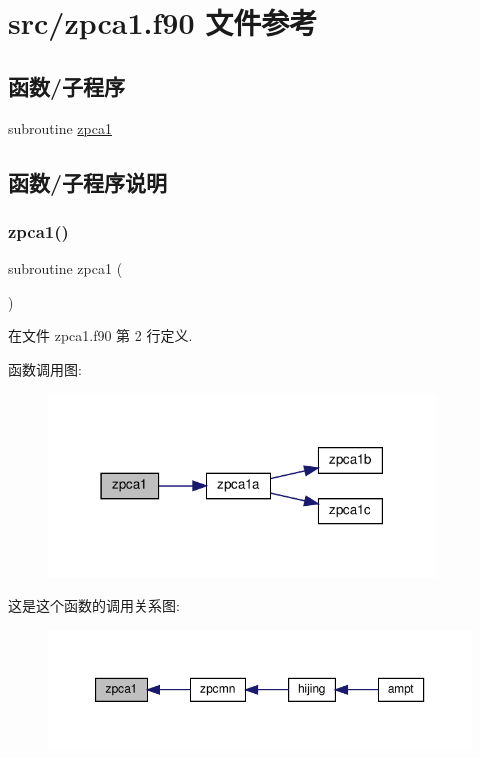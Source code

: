 \hypertarget{zpca1_8f90}{}\section{src/zpca1.f90 文件参考}
\label{zpca1_8f90}
\subsection*{函数/子程序}
\begin{DoxyCompactItemize}
\item 
subroutine \mbox{\hyperlink{zpca1_8f90_a08b079fdaae5d2ad9c8113386a744b39}{zpca1}}
\end{DoxyCompactItemize}


\subsection{函数/子程序说明}
\mbox{\label{zpca1_8f90_a08b079fdaae5d2ad9c8113386a744b39}} 
\subsubsection{\texorpdfstring{zpca1()}{zpca1()}}
{\footnotesize\ttfamily subroutine zpca1 (\begin{DoxyParamCaption}{ }\end{DoxyParamCaption})}



在文件 zpca1.\+f90 第 2 行定义.

函数调用图\+:
\nopagebreak
\begin{figure}[H]
\begin{center}
\leavevmode
\includegraphics[width=291pt]{zpca1_8f90_a08b079fdaae5d2ad9c8113386a744b39_cgraph}
\end{center}
\end{figure}
这是这个函数的调用关系图\+:
\nopagebreak
\begin{figure}[H]
\begin{center}
\leavevmode
\includegraphics[width=350pt]{zpca1_8f90_a08b079fdaae5d2ad9c8113386a744b39_icgraph}
\end{center}
\end{figure}
